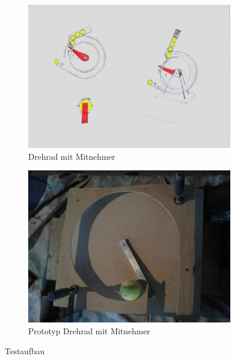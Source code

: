 \begin{figure}[h!]
	\centering
	\begin{subfigure}[b]{0.45\textwidth}
		\includegraphics[width=\textwidth]{../../fig/Drehrad_Mitnehmer.jpg}
		\caption{Drehrad mit Mitnehmer}
	\end{subfigure}
	\begin{subfigure}[b]{0.45\textwidth}
		\includegraphics[width=\textwidth]{../../fig/prototyp_propeller.jpg}
		\caption{Prototyp Drehrad mit Mitnehmer}
	\end{subfigure}
	\caption{Testaufbau}
	\label{fig:drehrad_mitnehmer}
\end{figure}
